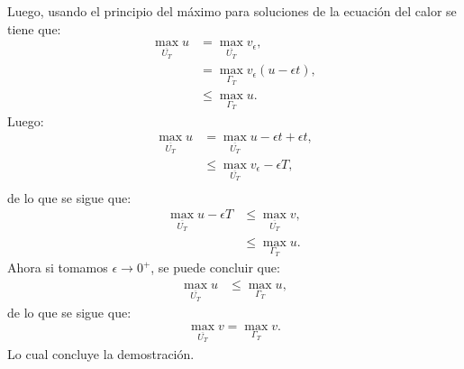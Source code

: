 \begin{homeworkProblem}
\begin{solucion}
    Luego, usando el principio del máximo para soluciones de la ecuación del calor se tiene que:
    \begin{align*}
      \max_{\overline{U_T}}u&=\max_{\overline{U_T}}v_\epsilon,\\
      &=\max_{\Gamma_T}v_\epsilon(u-\epsilon t),\\
      &\leq \max_{\Gamma_T}u.
    \end{align*}
    Luego:
    \begin{align*}
      \max_{\overline{U_T}}u&=\max_{\overline{U_T}}u-\epsilon t + \epsilon t,\\
      &\leq \max_{\overline{U_T}}v_\epsilon -\epsilon T,\\
    \end{align*}
    de lo que se sigue que:
    \begin{align*}
      \max_{\overline{U_T}}u-\epsilon T&\leq \max_{\overline{U_T}}v,\\
      &\leq \max_{\Gamma_T}u.
    \end{align*}
    Ahora si tomamos $\epsilon\rightarrow 0^+$, se puede concluir que:
    \begin{align*}
      \max_{\overline{U_T}}u&\leq \max_{\Gamma_T}u, 
    \end{align*}
    de lo que se sigue que:
    \begin{align*}
      \max_{\overline{U_T}}v=\max_{\Gamma_T}v.
    \end{align*}
    Lo cual concluye la demostración.
    \demostrado
  \end{solucion}  
\end{homeworkProblem}
